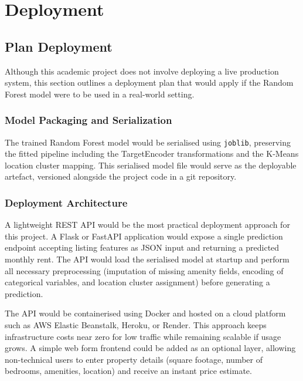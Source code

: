 \section{Deployment}

\subsection{Plan Deployment}
\label{subsec:Plan Deployment}

\noindent
Although this academic project does not involve deploying a live production system, this section outlines a deployment plan that would apply if the Random Forest model were to be used in a real-world setting.

\subsubsection{Model Packaging and Serialization}

\noindent
The trained Random Forest model would be serialised using \texttt{joblib}, preserving the fitted pipeline including the TargetEncoder transformations and the K-Means location cluster mapping. This serialised model file would serve as the deployable artefact, versioned alongside the project code in a git repository.

\subsubsection{Deployment Architecture}

\noindent
A lightweight REST API would be the most practical deployment approach for this project. A Flask or FastAPI application would expose a single prediction endpoint accepting listing features as JSON input and returning a predicted monthly rent. The API would load the serialised model at startup and perform all necessary preprocessing (imputation of missing amenity fields, encoding of categorical variables, and location cluster assignment) before generating a prediction.

\noindent
The API would be containerised using Docker and hosted on a cloud platform such as AWS Elastic Beanstalk, Heroku, or Render. This approach keeps infrastructure costs near zero for low traffic while remaining scalable if usage grows. A simple web form frontend could be added as an optional layer, allowing non-technical users to enter property details (square footage, number of bedrooms, amenities, location) and receive an instant price estimate.

